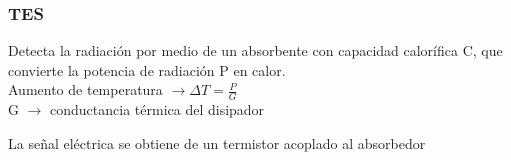 \documentclass{beamer}
\begin{document}
\begin{frame}
				\frametitle{TES}
				Detecta la radiación por medio de un absorbente con capacidad calorífica
				C, que convierte la potencia de radiación P en calor.\\
				Aumento de temperatura \alert{$\to \Delta T = \frac{P}{G}$}\\

				G $\to$ conductancia térmica del disipador

        La señal eléctrica se obtiene de un termistor acoplado al absorbedor 
								\begin{center}
								\end{center}
\end{frame} 
\end{document}
